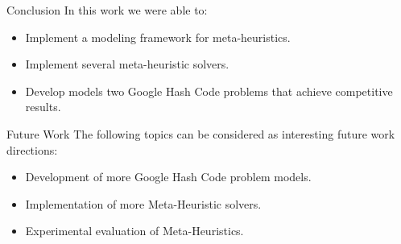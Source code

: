 \begin{frame}{Conclusion}
  In this work we were able to:

  \begin{itemize}
    \item Implement a modeling framework for meta-heuristics.
    \item Implement several meta-heuristic solvers.
    \item Develop models two Google Hash Code problems that achieve competitive results.
  \end{itemize}
\end{frame}

\begin{frame}{Future Work}
  The following topics can be considered as interesting future work directions:
  \begin{itemize}
    \item Development of more Google Hash Code problem models.
    \item Implementation of more Meta-Heuristic solvers.
    \item Experimental evaluation of Meta-Heuristics.
  \end{itemize}

\end{frame}